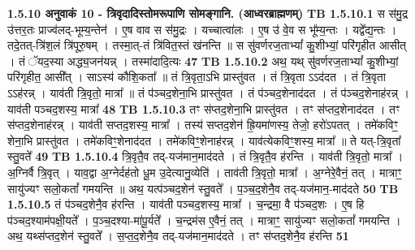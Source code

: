 \documentclass[17pt]{extarticle}
\begin{document}
                \textbf{ 1.5.10    अनुवाकं   10 - त्रिवृदादिस्तोमरूपाणि सोमङ्गानि. (आध्वरब्राह्मणम्)} \newline
                                \textbf{ TB 1.5.10.1} \newline
                  स स॑मु॒द्र उ॑त्तर॒तः प्राज्व॑लद्-भूम्य॒न्तेन॑ । ए॒ष वाव स स॑मु॒द्रः । यच्चात्वा॑लः । ए॒ष उ॑ वे॒व स भू᳚म्य॒न्तः । यद्वे᳚द्य॒न्तः । तदे॒तत्-त्रि॑श॒लं त्रि॑पूरु॒षम् । तस्मा॒त्-तं त्रि॑वित॒स्तं ख॑नन्ति ॥ स सु॑वर्णरज॒ताभ्यां᳚ कु॒शीभ्यां॒ परि॑गृहीत आसीत् । तं ॅयद॒स्या अद्ध्य॒जन॑यन्न् । तस्मा॑दादि॒त्यः \textbf{ 47} \newline
                  \newline
                                \textbf{ TB 1.5.10.2} \newline
                  अथ॒ यथ् सु॑वर्णरज॒ताभ्यां᳚ कु॒शीभ्यां॒ परि॑गृहीत॒ आसी᳚त् । साऽस्य॑ कौशि॒कता᳚ ॥ तं त्रि॒वृता॒ऽभि प्रास्तु॑वत । तं त्रि॒वृता ऽऽद॑दत । तं त्रि॒वृता ऽऽह॑रन्न् । याव॑ती त्रि॒वृतो॒ मात्रा᳚ ॥ तं प॑ञ्चद॒शेना॒भि प्रास्तु॑वत । तं प॑ञ्चद॒शेनाद॑दत । तं प॑ञ्चद॒शेनाह॑रन्न् । याव॑ती पञ्चद॒शस्य॒ मात्रा᳚ \textbf{ 48} \newline
                  \newline
                                \textbf{ TB 1.5.10.3} \newline
                  तꣳ स॑प्तद॒शेना॒भि प्रास्तु॑वत । तꣳ स॑प्तद॒शेनाद॑दत । तꣳ स॑प्तद॒शेनाह॑रन्न् । याव॑ती सप्तद॒शस्य॒ मात्रा᳚ । तस्य॑ सप्तद॒शेन॑ ह्रि॒यमा॑णस्य॒ तेजो॒ हरो॑ऽपतत् । तमे॑कविꣳ॒॒ शेना॒भि प्रास्तु॑वत । तमे॑कविꣳ॒॒शेनाद॑दत । तमे॑कविꣳ॒॒शेनाह॑रन्न् । याव॑त्येकविꣳ॒॒शस्य॒ मात्रा᳚ ॥ ते यत्-त्रि॒वृता᳚ स्तु॒वते᳚ \textbf{ 49} \newline
                  \newline
                                \textbf{ TB 1.5.10.4} \newline
                  त्रि॒वृतै॒व तद्-यज॑मान॒माद॑दते । तं त्रि॒वृतै॒व ह॑रन्ति । याव॑ती त्रि॒वृतो॒ मात्रा᳚ । अ॒ग्निर्वै त्रि॒वृत् । याव॒द्वा अ॒ग्नेर्दह॑तो धू॒म उ॒देत्यानु॒व्येति॑ । ताव॑ती त्रि॒वृतो॒ मात्रा᳚ । अ॒ग्नेरे॒वैनं॒ तत् । मात्राꣳ॒॒ सायु॑ज्यꣳ सलो॒कतां᳚ गमयन्ति ॥ अथ॒ यत्प॑ञ्चद॒शेन॑ स्तु॒वते᳚ । प॒ञ्च॒द॒शेनै॒व तद्-यज॑मान॒-माद॑दते \textbf{ 50} \newline
                  \newline
                                \textbf{ TB 1.5.10.5} \newline
                  तं प॑ञ्चद॒शेनै॒व ह॑रन्ति । याव॑ती पञ्चद॒शस्य॒ मात्रा᳚ । च॒न्द्रमा॒ वै प॑ञ्चद॒शः । ए॒ष हि प॑ञ्चद॒श्याम॑पक्षी॒यते᳚ । प॒ञ्च॒दश्या-मा॑पू॒र्यते᳚ । च॒न्द्रम॑स ए॒वैनं॒ तत् । मात्राꣳ॒॒ सायु॑ज्यꣳ सलो॒कतां᳚ गमयन्ति । अथ॒ यथ्स॑प्तद॒शेन॑ स्तु॒वते᳚ । स॒प्त॒द॒शेनै॒व तद्-यज॑मान॒माद॑दते । तꣳ स॑प्तद॒शेनै॒व ह॑रन्ति \textbf{ 51} \newline
\end{document}
